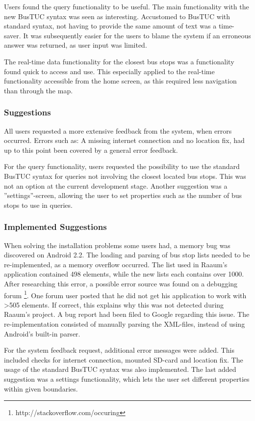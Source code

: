 Users found the query functionality to be useful. The main functionality with the new BusTUC syntax was seen as interesting. Accustomed to BusTUC with standard syntax, not having to provide the same amount of text was a time-saver. It was subsequently easier for the users to blame the system if an erroneous answer was returned, as user input was limited.


The real-time data functionality for the closest bus stops was a functionality found quick to access and use. This especially applied to the real-time functionality accessible from the home screen, as this required less navigation than through the map.

\subsubsection{Suggestions}
All users requested a more extensive feedback from the system, when errors occurred. Errors such as: A missing internet connection and no location fix, had up to this point been covered by a general error feedback.

For the query functionality, users requested the possibility to use the standard BusTUC syntax for queries not involving the closest located bus stops. This was not an option at the current development stage. Another suggestion was a ''settings''-screen,  allowing the user to set properties such as the number of bus stops to use in queries. 

\subsubsection{Implemented Suggestions}
When solving the installation problems some users had, a memory bug was discovered on Android 2.2. The loading and parsing of bus stop lists needed to be re-implemented, as a memory overflow occurred. The list used in Raaum's application\cite{mag} contained 498 elements, while the new lists each contains over 1000. After researching this error, a possible error source was found on a debugging forum \footnote{http://stackoverflow.com/occuring}. One forum user posted that he did not get his application to work with >505 elements. If correct, this explains why this was not detected during Raaum's project. A bug report had been filed to Google regarding this issue. The re-implementation consisted of manually parsing the XML-files,  instead of using Android's built-in parser. 

For the system feedback request, additional error messages were added. This included checks for internet connection, mounted SD-card and location fix. The usage of the standard BusTUC syntax was also implemented. The last added suggestion was a settings functionality, which lets the user set different properties within given boundaries.

